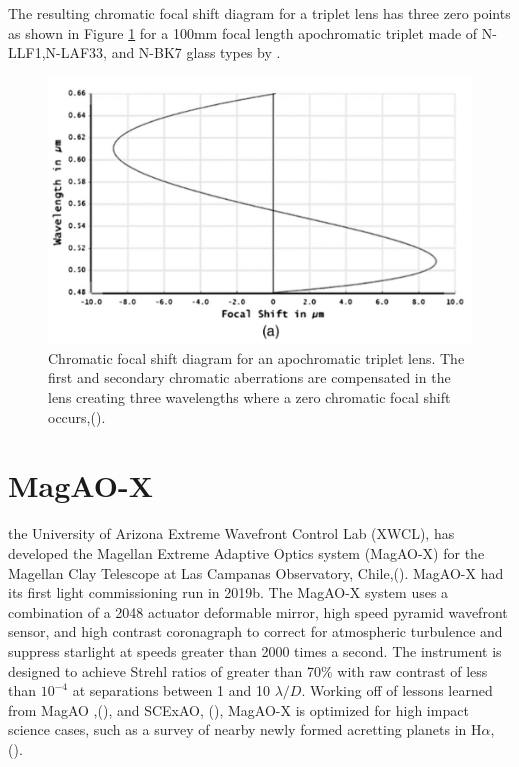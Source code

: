 The resulting chromatic focal shift diagram for a triplet lens has three zero points as shown in Figure \ref{fig:apochromat} for a 100mm focal length apochromatic triplet made of N-LLF1,N-LAF33, and N-BK7 glass types by \cite{sasian2017method}. 

\begin{figure}
    \centering
    \includegraphics[width=.6\textwidth]{Chapter Materials/Chapter Three Materials/tripleapochromat.PNG}
    \caption{Chromatic focal shift diagram for an apochromatic triplet lens. The first and secondary chromatic aberrations are compensated in the lens creating three wavelengths where a zero chromatic focal shift occurs,(\cite{sasian2017method}).}
    \label{fig:apochromat}
\end{figure}









\section{MagAO-X}
	
the University of Arizona Extreme Wavefront Control Lab (XWCL), has developed the Magellan Extreme Adaptive Optics system (MagAO-X) for the Magellan Clay Telescope at Las Campanas Observatory, Chile,(\cite{males2020magao}). MagAO-X had its first light commissioning run in 2019b. The MagAO-X system uses a combination of a 2048 actuator deformable mirror, high speed pyramid wavefront sensor, and high contrast coronagraph to correct for atmospheric turbulence and suppress starlight at speeds greater than 2000 times a second. The instrument is designed to achieve Strehl ratios of greater than 70$\%$ with raw contrast of less than $10^{-4}$ at separations between 1 and 10 $\lambda/D$.\cite{males2018magao} Working off of lessons learned from MagAO ,(\cite{close2018status}), and SCExAO, (\cite{jovanovic2015subaru}), MagAO-X is optimized for high impact science cases, such as a survey of nearby newly formed acretting planets in H$\alpha$, (\cite{males2020magao}).

